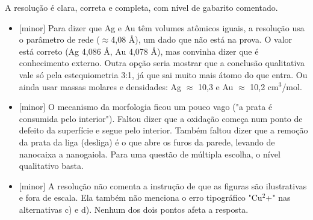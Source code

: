 \documentclass{article}%
\begin{document}
\newline%
A resolução é clara, correta e completa, com nível de gabarito comentado.%
\begin{itemize}%
\item%
{[}minor{]} Para dizer que Ag e Au têm volumes atômicos iguais, a resolução usa o parâmetro de rede ($\approx$4,08 Å), um dado que não está na prova. O valor está correto (Ag 4,086 Å, Au 4,078 Å), mas convinha dizer que é conhecimento externo. Outra opção seria mostrar que a conclusão qualitativa vale só pela estequiometria 3:1, já que sai muito mais átomo do que entra. Ou ainda usar massas molares e densidades: Ag $\approx$ 10,3 e Au $\approx$ 10,2 cm$^3$/mol.%
\item%
{[}minor{]} O mecanismo da morfologia ficou um pouco vago ("a prata é consumida pelo interior"). Faltou dizer que a oxidação começa num ponto de defeito da superfície e segue pelo interior. Também faltou dizer que a remoção da prata da liga (desliga) é o que abre os furos da parede, levando de nanocaixa a nanogaiola. Para uma questão de múltipla escolha, o nível qualitativo basta.%
\item%
{[}minor{]} A resolução não comenta a instrução de que as figuras são ilustrativas e fora de escala. Ela também não menciona o erro tipográfico "Cu$^2$+" nas alternativas c) e d). Nenhum dos dois pontos afeta a resposta.%
\end{itemize}%
\end{document}
